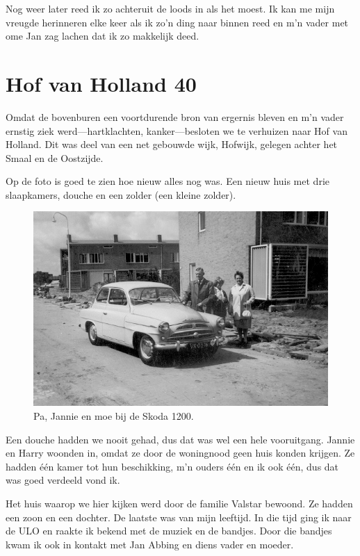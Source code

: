 \documentclass[12pt,twoside, openright]{memoir}
\begin{document}
Nog weer later reed ik zo achteruit de loods in als het moest. Ik kan me mijn vreugde herinneren elke keer als ik zo'n ding naar binnen reed en m'n vader met ome Jan zag lachen dat ik zo makkelijk deed.

\section*{Hof van Holland 40} %
\label{cha:hofvanholland}

Omdat de bovenburen een voortdurende bron van ergernis bleven en m’n vader ernstig ziek werd---hartklachten, kanker---besloten we te verhuizen naar Hof van Holland. Dit was deel van een net gebouwde wijk, Hofwijk, gelegen achter het Smaal en de Oostzijde. 

Op de foto is goed te zien hoe nieuw alles nog was. Een nieuw huis met drie slaapkamers, douche en een zolder (een kleine zolder). 

\begin{figure}
\centering
\includegraphics[width=\textwidth]{img/ch21/skoda}
\caption*{\footnotesize Pa, Jannie en moe bij de Skoda 1200.}
\end{figure}

Een douche hadden we nooit gehad, dus dat was wel een hele vooruitgang. Jannie en Harry woonden in, omdat ze door de woningnood geen huis konden krijgen. Ze hadden één kamer tot hun beschikking, m’n ouders één en ik ook één, dus dat was goed verdeeld vond ik. 

Het huis waarop we hier kijken werd door de familie Valstar bewoond. Ze hadden een zoon en een dochter. De laatste was van mijn leeftijd. In die tijd ging ik naar de ULO en raakte ik bekend met de muziek en de bandjes. Door die bandjes kwam ik ook in kontakt met Jan Abbing en diens vader en moeder. 
\end{document}
